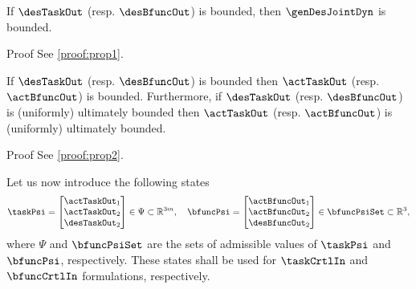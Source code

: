 \begin{proposition}\label{prop 1}
	If $\desTaskOut $ (resp. $\desBfuncOut $) is bounded, then $\genDesJointDyn $ is bounded. 
\end{proposition}
\begin{custumProof}{Proof}
	See \cref{proof:prop1}.
\end{custumProof}

\begin{proposition}\label{prop 2}
	If $\desTaskOut $ (resp. $\desBfuncOut $)  is  bounded then $\actTaskOut $ (resp. $\actBfuncOut$) is  bounded. Furthermore, if $\desTaskOut $ (resp. $\desBfuncOut $) is (uniformly) ultimately bounded 
	then $\actTaskOut $ (resp. $\actBfuncOut$) is (uniformly) ultimately bounded.
\end{proposition}
\begin{custumProof}{Proof}
	See \cref{proof:prop2}.
\end{custumProof}

Let us now introduce the following states
\begin{align}\label{eq:psi}
	\taskPsi = \begin{bmatrix}
		\actTaskOut_1 \\ 	\actTaskOut_2 \\ \desTaskOut_2
	\end{bmatrix}\in\Psi\subset\mathbb{R}^{3m}, %
\quad	\bfuncPsi = \begin{bmatrix}
		\actBfuncOut_1\\ 	\actBfuncOut_2 \\ \desBfuncOut_2
	\end{bmatrix}\in\bfuncPsiSet\subset\mathbb{R}^{3},
\end{align} 
where $\Psi$ and $\bfuncPsiSet$ are the sets of admissible values of $\taskPsi$ and $\bfuncPsi$, respectively. These states shall be used for $\taskCrtlIn$ and $\bfuncCrtlIn$ formulations, respectively.

